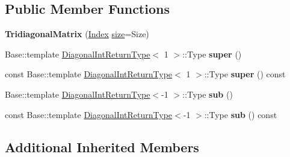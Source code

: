 \subsection*{Public Member Functions}
\begin{DoxyCompactItemize}
\item 
\mbox{\label{class_eigen_1_1internal_1_1_tridiagonal_matrix_aab31bf324b1a8483daaab0228e5d58e4}} 
{\bfseries Tridiagonal\+Matrix} (\mbox{\hyperlink{struct_eigen_1_1_eigen_base_a554f30542cc2316add4b1ea0a492ff02}{Index}} \mbox{\hyperlink{struct_eigen_1_1_eigen_base_ac2c9348df3bb9c0044dbae6c278a8977}{size}}=Size)
\item 
\mbox{\label{class_eigen_1_1internal_1_1_tridiagonal_matrix_a4dd80e1c56266c7ddc114df3d2e6c4ed}} 
Base\+::template \mbox{\hyperlink{struct_eigen_1_1internal_1_1_band_matrix_base_1_1_diagonal_int_return_type}{Diagonal\+Int\+Return\+Type}}$<$ 1 $>$\+::Type {\bfseries super} ()
\item 
\mbox{\label{class_eigen_1_1internal_1_1_tridiagonal_matrix_a46ce3f9443c072c8f51e4593316b3d26}} 
const Base\+::template \mbox{\hyperlink{struct_eigen_1_1internal_1_1_band_matrix_base_1_1_diagonal_int_return_type}{Diagonal\+Int\+Return\+Type}}$<$ 1 $>$\+::Type {\bfseries super} () const
\item 
\mbox{\label{class_eigen_1_1internal_1_1_tridiagonal_matrix_ad372b8a35f44e6865c8f80eaf79ff7ab}} 
Base\+::template \mbox{\hyperlink{struct_eigen_1_1internal_1_1_band_matrix_base_1_1_diagonal_int_return_type}{Diagonal\+Int\+Return\+Type}}$<$-\/1 $>$\+::Type {\bfseries sub} ()
\item 
\mbox{\label{class_eigen_1_1internal_1_1_tridiagonal_matrix_a7d3298c8f8733abb1442f9d7eab5e00e}} 
const Base\+::template \mbox{\hyperlink{struct_eigen_1_1internal_1_1_band_matrix_base_1_1_diagonal_int_return_type}{Diagonal\+Int\+Return\+Type}}$<$-\/1 $>$\+::Type {\bfseries sub} () const
\end{DoxyCompactItemize}
\subsection*{Additional Inherited Members}


